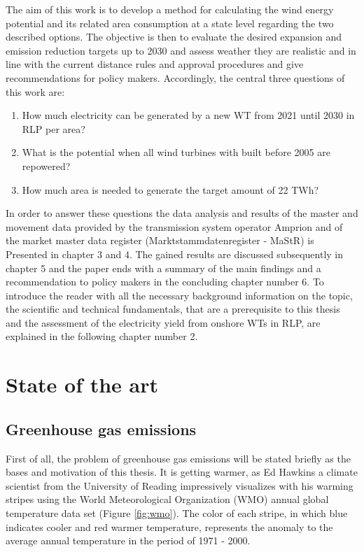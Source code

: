 \documentclass[a4paper,11pt]{article}
\begin{document}
The aim of this work is to develop a method for calculating the wind energy potential and its related area consumption at a state level regarding the two described options. The objective is then to evaluate the desired expansion and emission reduction targets up to 2030 and assess weather they are realistic and in line with the current distance rules and approval procedures and give recommendations for policy makers. Accordingly, the central three questions of this work are:
\begin{enumerate}
\def\labelenumi{\arabic{enumi}.}
\item
  How much electricity can be generated by a new WT from 2021 until 2030 in RLP per area?
\item
  What is the potential when all wind turbines with built before 2005 are repowered?
\item
  How much area is needed to generate the target amount of 22 TWh?
\end{enumerate}
In order to answer these questions the data analysis and results of the master and movement data provided by the transmission system operator Amprion and of the market master data register (Marktstammdatenregister - MaStR) is Presented in chapter 3 and 4. The gained results are discussed subsequently in chapter 5 and the paper ends with a summary of the main findings and a recommendation to policy makers in the concluding chapter number 6. To introduce the reader with all the necessary background information on the topic, the scientific and technical fundamentals, that are a prerequisite to this thesis and the assessment of the electricity yield from onshore WTs in RLP, are explained in the following chapter number 2.

\hypertarget{state-of-the-art}{%
\section{State of the art}\label{state-of-the-art}}

\hypertarget{greenhouse-gas-emissions}{%
\subsection{Greenhouse gas emissions}\label{greenhouse-gas-emissions}}

First of all, the problem of greenhouse gas emissions will be stated briefly as the bases and motivation of this thesis. It is getting warmer, as Ed Hawkins a climate scientist from the University of Reading impressively visualizes with his warming stripes using the World Meteorological Organization (WMO) annual global temperature data set (Figure \ref{fig:wmo}). The color of each stripe, in which blue indicates cooler and red warmer temperature, represents the anomaly to the average annual temperature in the period of 1971 - 2000.
\end{document}

